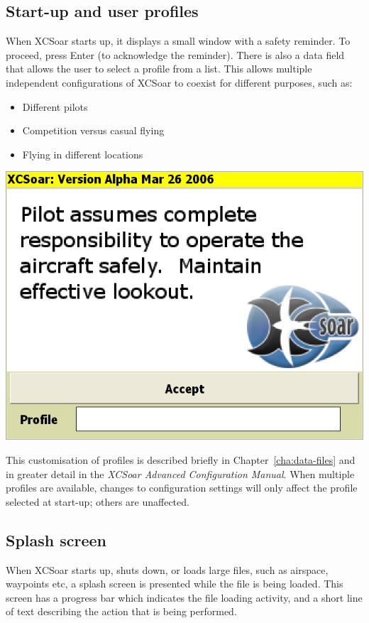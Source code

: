 \documentclass[a4paper,12pt]{refrep}
\begin{document}
\subsection*{Start-up and user profiles}

When XCSoar starts up, it displays a small window with a safety
reminder.  To proceed, press Enter (to acknowledge the reminder).
There is also a data field that allows the user to select a profile
from a list.  This allows multiple independent configurations of
XCSoar to coexist for different purposes, such as:
\begin{itemize}
\item Different pilots
\item Competition versus casual flying
\item Flying in different locations
\end{itemize}

\begin{center}
\includegraphics[angle=0,width=0.7\linewidth,keepaspectratio='true']{figures/disclaimer.png}
\end{center}

This customisation of profiles is described briefly in
Chapter~\ref{cha:data-files} and in greater detail in the {\em XCSoar
Advanced Configuration Manual}.  When multiple profiles are available,
changes to configuration settings will only affect the profile
selected at start-up; others are unaffected.

\subsection*{Splash screen}

When XCSoar starts up, shuts down, or loads large files, such as
airspace, waypoints etc, a splash screen is presented while the file
is being loaded.  This screen has a progress bar which indicates the
file loading activity, and a short line of text describing the action
that is being performed.
\end{document}
